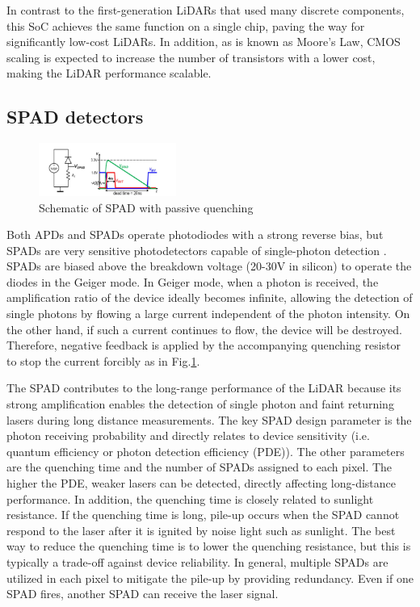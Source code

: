 \documentclass[paper]{ieice}
\begin{document}
In contrast to the first-generation LiDARs that used many discrete components, this SoC achieves the same function on a single chip, paving the way for significantly low-cost LiDARs. In addition, as is known as Moore's Law, CMOS scaling is expected to increase the number of transistors with a lower cost, making the LiDAR performance scalable.

\subsection{SPAD detectors}
\begin{figure}[!t]
\centering
 \includegraphics[width=0.4\textwidth]{figs/spad.png}
  \caption{Schematic of SPAD with passive quenching \cite{niclass2007spad}}
\label{spad}
\end{figure}

\qquad Both APDs and SPADs operate photodiodes with a strong reverse bias, but SPADs are very sensitive photodetectors capable of single-photon detection \cite{niclass2005design, zappa2007spad, stoppa2009spad, niclass2007spad, gariepy2015single}. SPADs are biased above the breakdown voltage (20-30V in silicon) to operate the diodes in the Geiger mode. In Geiger mode, when a photon is received, the amplification ratio of the device ideally becomes infinite, allowing the detection of single photons by flowing a large current independent of the photon intensity. On the other hand, if such a current continues to flow, the device will be destroyed. Therefore, negative feedback is applied by the accompanying quenching resistor to stop the current forcibly as in Fig.\ref{spad}.

The SPAD contributes to the long-range performance of the LiDAR because its strong amplification enables the detection of single photon and faint returning lasers during long distance measurements. The key SPAD design parameter is the photon receiving probability and directly relates to device sensitivity (i.e. quantum efficiency or photon detection efficiency (PDE)). The other parameters are the quenching time and the number of SPADs assigned to each pixel. The higher the PDE, weaker lasers can be detected, directly affecting long-distance performance. In addition, the quenching time is closely related to sunlight resistance. If the quenching time is long, pile-up occurs when the SPAD cannot respond to the laser after it is ignited by noise light such as sunlight. The best way to reduce the quenching time is to lower the quenching resistance, but this is typically a trade-off against device reliability. In general, multiple SPADs are utilized in each pixel to mitigate the pile-up by providing redundancy. Even if one SPAD fires, another SPAD can receive the laser signal.
\end{document}
